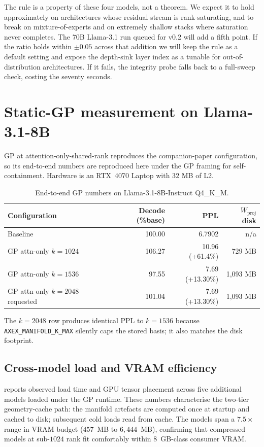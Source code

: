 \documentclass[11pt]{article}
\begin{document}
The rule is a property of these four models, not a theorem. We expect
it to hold approximately on architectures whose residual stream is
rank-saturating, and to break on mixture-of-experts and on extremely
shallow stacks where saturation never completes. The 70B Llama-3.1
run queued for v0.2 will add a fifth point. If the ratio holds within
$\pm 0.05$ across that addition we will keep the rule as a default
setting and expose the depth-sink layer index as a tunable for
out-of-distribution architectures. If it fails, the integrity probe
falls back to a full-sweep check, costing the seventy seconds.

\section{Static-GP measurement on Llama-3.1-8B}
\label{sec:anchor}
GP at attention-only-shared-rank reproduces the companion-paper
configuration, so its end-to-end numbers are reproduced here under the
GP framing for self-containment. Hardware is an RTX~4070 Laptop with
$32$ MB of L2.

\begin{table}[h]\centering\small
\caption{End-to-end GP numbers on Llama-3.1-8B-Instruct Q4\_K\_M.}
\begin{tabular}{@{}lrrr@{}}
\toprule
Configuration & Decode (\%base) & PPL & $W_\text{proj}$ disk \\
\midrule
Baseline & 100.00 & 6.7902 & n/a \\
GP attn-only $k{=}1024$ & 106.27 & 10.96 (+61.4\%) & 729 MB \\
GP attn-only $k{=}1536$ & 97.55  & 7.69 (+13.30\%) & 1{,}093 MB \\
GP attn-only $k{=}2048$ requested & 101.04 & 7.69 (+13.30\%) & 1{,}093 MB \\
\bottomrule
\end{tabular}
\end{table}

The $k{=}2048$ row produces identical PPL to $k{=}1536$ because
\texttt{AXEX\_MANIFOLD\_K\_MAX} silently caps the stored basis; it
also matches the disk footprint.

\subsection{Cross-model load and VRAM efficiency}
 reports observed load time and GPU tensor placement
across five additional models loaded under the GP runtime.  These numbers
characterise the two-tier geometry-cache path: the manifold artefacts
are computed once at startup and cached to disk; subsequent cold loads
read from cache.  The models span a $7.5\times$ range in VRAM budget
($457$~MB to $6{,}444$~MB), confirming that compressed models at
sub-$1024$ rank fit comfortably within 8~GB-class consumer VRAM.
\end{document}
